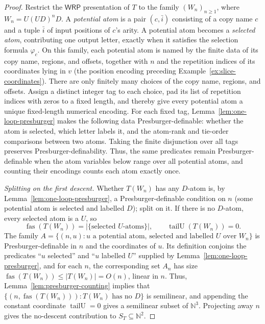 \documentclass[11pt]{article}
\theoremstyle{definition}
\newcommand{\N}{\mathbb N}
\newcommand{\WRP}{\mathsf{WRP}}
\newcommand{\fas}{\operatorname{fas}}
\newcommand{\tailU}{\operatorname{tailU}}
\begin{document}
\begin{proof}
Restrict the $\WRP$ presentation of $T$ to the family
$(W_n)_{n\ge1}$, where $W_n=U(UD)^nD$.
A \emph{potential atom} is a pair $(c,\bar i)$ consisting of a copy name $c$ and
a tuple $\bar i$ of input positions of $c$'s arity.  A potential atom becomes
a \emph{selected atom}, contributing one output letter, exactly when it
satisfies the selection formula $\varphi_c$.  On this family, each potential
atom is named by the finite data of its copy name, regions, and offsets,
together with $n$ and the repetition indices of its coordinates lying in $v$
(the position encoding preceding Example~\ref{ex:slice-coordinates}).  There
are only finitely many choices of the copy name, regions, and offsets.  Assign
a distinct integer tag to each choice, pad its list of repetition indices with
zeros to a fixed length, and thereby give every potential atom a unique
fixed-length numerical encoding.  For each fixed tag,
Lemma~\ref{lem:one-loop-presburger} makes the following data
Presburger-definable: whether the atom is selected, which letter labels it,
and the atom-rank and tie-order comparisons between two atoms.  Taking the
finite disjunction over all tags preserves Presburger-definability.  Thus, the
same predicates remain Presburger-definable when the atom variables below
range over all potential atoms, and counting their encodings counts each atom
exactly once.

\vspace{0.5em}
\noindent\emph{Splitting on the first descent.}
Whether $T(W_n)$ has any $D$-atom is, by Lemma~\ref{lem:one-loop-presburger}, a
Presburger-definable condition on $n$ (some potential atom is selected and labelled $D$); split
on it.  If there is no $D$-atom, every selected atom is a $U$, so
\[
   \fas(T(W_n))=|\{\text{selected $U$-atoms}\}|,\qquad
   \tailU(T(W_n))=0.
\]
The family $A=\{(n,u):u\text{ a potential atom, selected and labelled $U$ over }W_n\}$
is Presburger-definable in $n$ and the coordinates of $u$.  Its definition
conjoins the predicates ``$u$ selected'' and ``$u$ labelled $U$'' supplied by
Lemma~\ref{lem:one-loop-presburger}, and for each $n$, the corresponding set
$A_n$ has size
$\fas(T(W_n))\le|T(W_n)|=O(n)$, linear in $n$.  Thus,
Lemma~\ref{lem:presburger-counting} implies that
$\{(n,\fas(T(W_n))):T(W_n)\text{ has no }D\}$ is semilinear, and appending the
constant coordinate $\tailU=0$ gives a semilinear subset of $\N^3$.
Projecting away $n$ gives the no-descent contribution to $S_T\subseteq\N^2$.


\end{proof}
\end{document}
